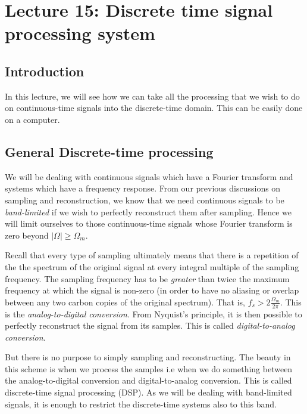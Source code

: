 \section{Lecture 15: Discrete time signal processing system}


\subsection{Introduction}
In this lecture, we will see how we can take all the processing that we wish to do on continuous-time signals into the discrete-time domain. This can be easily done on a computer.

\subsection{General Discrete-time processing}
We will be dealing with continuous signals which have a Fourier transform and systems which have a frequency response. From our previous discussions on sampling and reconstruction, we know that we need continuous signals to be \textit{band-limited} if we wish to perfectly reconstruct them after sampling. Hence we will limit ourselves to those continuous-time signals whose Fourier transform is zero beyond $|\Omega| \geq \Omega_{m}$. 

Recall that every type of sampling ultimately means that there is a repetition of the the spectrum of the original signal at every integral multiple of the sampling frequency. The sampling frequency has to be \textit{greater} than twice the maximum frequency at which the signal is non-zero (in order to have no aliasing or overlap between any two carbon copies of the original spectrum). That is, $f_{s} > 2\frac{\Omega_{m}}{2\pi}$. This is the \textit{analog-to-digital conversion}. From Nyquist's principle, it is then possible to perfectly reconstruct the signal from its samples. This is called \textit{digital-to-analog conversion}. 

But there is no purpose to simply sampling and reconstructing. The beauty in this scheme is when we process the samples i.e when we do something between the analog-to-digital conversion and digital-to-analog conversion. This is called discrete-time signal processing (DSP). As we will be dealing with band-limited signals, it is enough to restrict the discrete-time systems also to this band. 

